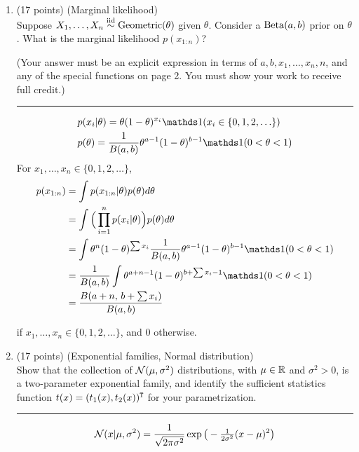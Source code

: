 \documentclass[12pt]{article}
\newcommand*\circled[1]{\tikz[baseline=(char.base)]{\node[shape=rectangle,draw,inner sep=2mm,rounded corners=2mm] (char) {#1};}}
\begin{document}
\begin{enumerate}
\newpage
\item (17 points) (Marginal likelihood)\\
    Suppose $X_1,\ldots,X_n\stackrel{\mathrm{iid}}{\sim}\operatorname*{Geometric}(\theta)$ given $\theta$. Consider a $\operatorname*{Beta}(a,b)$ prior on $\theta$. What is the
    marginal likelihood $p(x_{1:n})$?
    
    \vspace{1em}
    (Your answer must be an explicit expression in terms of $a,b,x_1,\ldots,x_n,n$, and any of the special
    functions on page 2. You must show your work to receive full credit.)

    \vspace{1em} \hrule
    \begin{align*}
        & p(x_i|\theta) = \theta(1-\theta)^{x_i}\I(x_i\in\{0,1,2,\ldots\})\\
        & p(\theta) = \frac{1}{B(a,b)}\theta^{a-1}(1-\theta)^{b-1}\I(0<\theta<1)\\
    \end{align*}
    For $x_1,\ldots,x_n\in\{0,1,2,\ldots\}$, 
    \begin{align*}
        p(x_{1:n}) & = \int p(x_{1:n}|\theta)p(\theta)d\theta \\
        & = \int \Big(\prod_{i=1}^n p(x_i|\theta)\Big)p(\theta)d\theta \\
        & = \int \theta^n (1-\theta)^{\sum x_i} \frac{1}{B(a,b)}\theta^{a-1}(1-\theta)^{b-1}\I(0<\theta<1)\\
        & = \frac{1}{B(a,b)} \int \theta^{a+n-1}(1-\theta)^{b+\sum x_i-1}\I(0<\theta<1)\\
        & = \frac{B(a+n,\,b+\sum x_i)}{B(a,b)}
    \end{align*}
    \begin{center}
    \circled{$\displaystyle p(x_{1:n}) = \frac{B(a+n,\,b+\sum x_i)}{B(a,b)}$} if $x_1,\ldots,x_n\in\{0,1,2,\ldots\}$, and 0 otherwise.
    \end{center}


\newpage
\item (17 points) (Exponential families, Normal distribution)\\
    Show that the collection of $\mathcal{N}(\mu,\sigma^2)$ distributions, with $\mu\in\mathbb{R}$ and $\sigma^2>0$, is a
    two-parameter exponential family, and identify the sufficient statistics function $t(x)=(t_1(x),t_2(x))^{\mathtt{T}}$ for your parametrization.

    \vspace{1em} \hrule
    $$\mathcal{N}(x|\mu,\sigma^2) = \frac{1}{\sqrt{2\pi\sigma^2}}\exp\big(-\tfrac{1}{2\sigma^2}(x-\mu)^2\big)$$


\end{enumerate}
\end{document}
